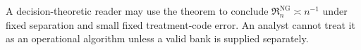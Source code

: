 A decision-theoretic reader may use the theorem to conclude \(\mathfrak R_n^{\mathrm{NG}}\asymp n^{-1}\) under fixed separation and small fixed treatment-code error.  An analyst cannot treat it as an operational algorithm unless a valid bank is supplied separately.